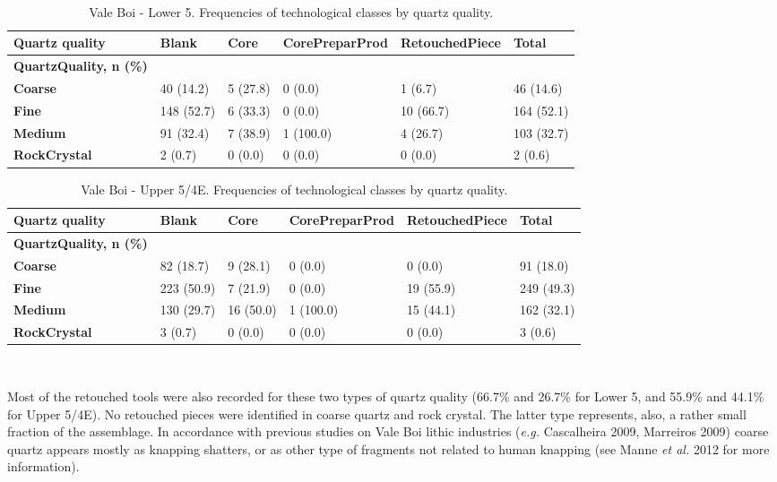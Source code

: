 \documentclass[12pt,twoside]{reedthesis}
\begin{document}
~
\begin{table}[!h]

\caption{\label{tab:quartzquality1}Vale Boi - Lower 5. Frequencies of technological classes by quartz quality.}
\centering
\fontsize{9}{11}\selectfont
\begin{tabular}[t]{>{\bfseries}llllll}
\toprule
Quartz quality & Blank & Core & CorePreparProd & RetouchedPiece & Total\\
\midrule
QuartzQuality, n (\%) &  &  &  &  & \\
Coarse & 40 (14.2) & 5 (27.8) & 0 (0.0) & 1 (6.7) & 46 (14.6)\\
Fine & 148 (52.7) & 6 (33.3) & 0 (0.0) & 10 (66.7) & 164 (52.1)\\
Medium & 91 (32.4) & 7 (38.9) & 1 (100.0) & 4 (26.7) & 103 (32.7)\\
RockCrystal & 2 (0.7) & 0 (0.0) & 0 (0.0) & 0 (0.0) & 2 (0.6)\\
\bottomrule
\end{tabular}
\end{table}
\begin{table}[!h]

\caption{\label{tab:quartzquality2}Vale Boi - Upper 5/4E. Frequencies of technological classes by quartz quality.}
\centering
\fontsize{9}{11}\selectfont
\begin{tabular}[t]{>{\bfseries}llllll}
\toprule
Quartz quality & Blank & Core & CorePreparProd & RetouchedPiece & Total\\
\midrule
QuartzQuality, n (\%) &  &  &  &  & \\
Coarse & 82 (18.7) & 9 (28.1) & 0 (0.0) & 0 (0.0) & 91 (18.0)\\
Fine & 223 (50.9) & 7 (21.9) & 0 (0.0) & 19 (55.9) & 249 (49.3)\\
Medium & 130 (29.7) & 16 (50.0) & 1 (100.0) & 15 (44.1) & 162 (32.1)\\
RockCrystal & 3 (0.7) & 0 (0.0) & 0 (0.0) & 0 (0.0) & 3 (0.6)\\
\bottomrule
\end{tabular}
\end{table}
~

Most of the retouched tools were also recorded for these two types of quartz quality (66.7\% and 26.7\% for Lower 5, and 55.9\% and 44.1\% for Upper 5/4E). No retouched pieces were identified in coarse quartz and rock crystal. The latter type represents, also, a rather small fraction of the assemblage. In accordance with previous studies on Vale Boi lithic industries (\emph{e.g.} Cascalheira 2009, Marreiros 2009) coarse quartz appears mostly as knapping shatters, or as other type of fragments not related to human knapping (see Manne \emph{et al.} 2012 for more information).
\end{document}
